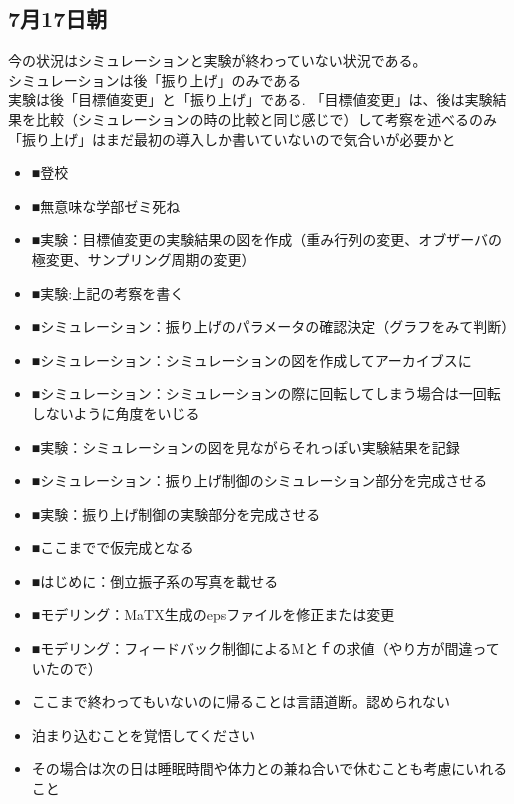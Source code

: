  \subsection{7月17日朝}
 今の状況はシミュレーションと実験が終わっていない状況である。\\
 シミュレーションは後「振り上げ」のみである\\
 実験は後「目標値変更」と「振り上げ」である.
 「目標値変更」は、後は実験結果を比較（シミュレーションの時の比較と同じ感じで）して考察を述べるのみ
 「振り上げ」はまだ最初の導入しか書いていないので気合いが必要かと
 \begin{itemize}
   \item ■登校
   \item ■無意味な学部ゼミ死ね
   \item ■実験：目標値変更の実験結果の図を作成（重み行列の変更、オブザーバの極変更、サンプリング周期の変更）
   \item ■実験:上記の考察を書く
   \item ■シミュレーション：振り上げのパラメータの確認決定（グラフをみて判断）
   \item ■シミュレーション：シミュレーションの図を作成してアーカイブスに
   \item ■シミュレーション：シミュレーションの際に回転してしまう場合は一回転しないように角度をいじる
   \item ■実験：シミュレーションの図を見ながらそれっぽい実験結果を記録
   \item ■シミュレーション：振り上げ制御のシミュレーション部分を完成させる
   \item ■実験：振り上げ制御の実験部分を完成させる
   \item ■ここまでで仮完成となる
   \item ■はじめに：倒立振子系の写真を載せる
   \item ■モデリング：MaTX生成のepsファイルを修正または変更
   \item ■モデリング：フィードバック制御によるMとｆの求値（やり方が間違っていたので）
   \item ここまで終わってもいないのに帰ることは言語道断。認められない
   \item 泊まり込むことを覚悟してください
   \item その場合は次の日は睡眠時間や体力との兼ね合いで休むことも考慮にいれること
 \end{itemize}
